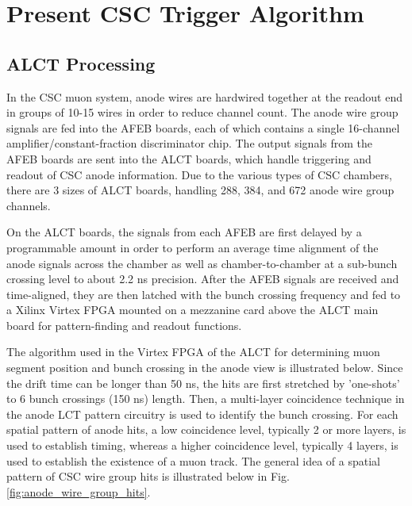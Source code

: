 \section{Present CSC Trigger Algorithm}
\label{sec:present_algo}

\subsection{ALCT Processing}

In the CSC muon system, anode wires are hardwired together at the readout end in groups of 10-15 wires in order to reduce channel count. The anode wire group signals are fed into the AFEB boards, each of which contains a single 16-channel amplifier/constant-fraction discriminator chip. The output signals from the AFEB boards are sent into the ALCT boards, which handle triggering and readout of CSC anode information. Due to the various types of CSC chambers, there are 3 sizes of ALCT boards, handling 288, 384, and 672 anode wire group channels.

On the ALCT boards, the signals from each AFEB are first delayed by a programmable amount in order to perform an average time alignment of the anode signals across the chamber as well as chamber-to-chamber at a sub-bunch crossing level to about 2.2 ns precision. After the AFEB signals are received and time-aligned, they are then latched with the bunch crossing frequency and fed to a Xilinx Virtex FPGA mounted on a mezzanine card above the ALCT main board for pattern-finding and readout functions.

The algorithm used in the Virtex FPGA of the ALCT for determining muon segment position and bunch crossing in the anode view is illustrated below. Since the drift time can be longer than 50 ns, the hits are first stretched by 'one-shots' to 6 bunch crossings (150 ns) length. Then, a multi-layer coincidence technique in the anode LCT pattern circuitry is used to identify the bunch crossing. For each spatial pattern of anode hits, a low coincidence level, typically 2 or more layers, is used to establish timing, whereas a higher coincidence level, typically 4 layers, is used to establish the existence of a muon track. The general idea of a spatial pattern of CSC wire group hits is illustrated below in Fig.\ref{fig:anode_wire_group_hits}.

